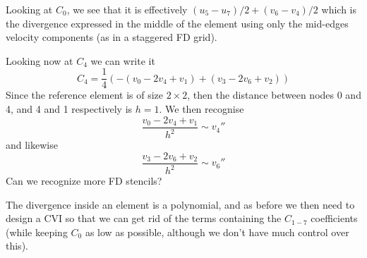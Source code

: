 Looking at $C_0$, we see that it is effectively $(u_5-u_7)/2+(v_6-v_4)/2$ which 
is the divergence expressed in the middle of the element using only the mid-edges 
velocity components (as in a staggered FD grid).

Looking now at $C_4$ we can write it
\[
C_4 = \frac{1}{4}(-(v_0 -2v_4 +v_1) + (v_3 -2v_6 +v_2) )   
\]
Since the reference element is of size $2\times 2$, then the 
distance between nodes 0 and 4, and 4 and 1 respectively is $h=1$.
We then recognise
\[
\frac{v_0 -2v_4 +v_1}{h^2} \sim v_4''
\]
and likewise
\[
\frac{v_3 -2v_6 +v_2}{h^2} \sim v_6''
\]
Can we recognize more FD stencils?









The divergence inside an element is a polynomial, and as before 
we then need to design a CVI so that we can get rid of the terms 
containing the $C_{1-7}$ coefficients (while keeping $C_0$ as low
as possible, although we don't have much control over this).

